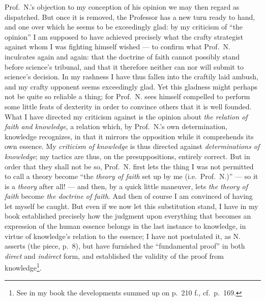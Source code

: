 \documentclass[12pt,a4paper]{book}
\begin{document}
Prof.\ N.'s objection to my conception of his opinion we may then regard as
dispatched. But once it is removed, the Professor has a new turn ready to hand,
and one over which he seems to be exceedingly glad: by my criticism of ``the
opinion'' I am supposed to have achieved precisely what the crafty strategist
against whom I was fighting himself wished --- to confirm what Prof.\ N.
inculcates again and again: that the doctrine of faith cannot possibly stand
before science's tribunal, and that it therefore neither can nor will submit to
science's decision. In my rashness I have thus fallen into the craftily laid
ambush, and my crafty opponent seems exceedingly glad. Yet this gladness might
perhaps not be quite so reliable a thing; for Prof.\ N. sees himself compelled
to perform some little feats of dexterity in order to convince others that it
is well founded. What I have directed my criticism against is the opinion about
\emph{the relation of faith and knowledge}, a relation which, by Prof.\ N.'s
own determination, knowledge recognizes, in that it mirrors the opposition
while it comprehends its own essence. My \emph{criticism of knowledge} is thus
directed against \emph{determinations of knowledge}; my tactics are thus, on
the presuppositions, entirely correct. But in order that they shall not be so,
Prof.\ N. first lets the thing I was not permitted to call a theory become
``the \emph{theory of faith} set up by me (i.e.\ Prof.\ N.)'' --- so it is a
\emph{theory} after all! --- and then, by a quick little maneuver, lets
\emph{the theory of faith} become \emph{the doctrine of faith}.
And then of course I am convinced of having let myself be caught. But even if
we now let this substitution stand, I have in my book established precisely how
the judgment upon everything that becomes an expression of the human essence
belongs in the last instance to knowledge, in virtue of knowledge's relation to
the essence; I have not postulated it, as N. asserts (the piece, p.\ 8), but
have furnished the ``fundamental
\setcounter{footnote}{0}%
proof'' in both \emph{direct} and \emph{indirect} form, and established the
validity of the proof from knowledge\footnote{%
  See in my book the developments summed up on p.\ 210 f., cf.\ p.\ 169.}.
\end{document}
